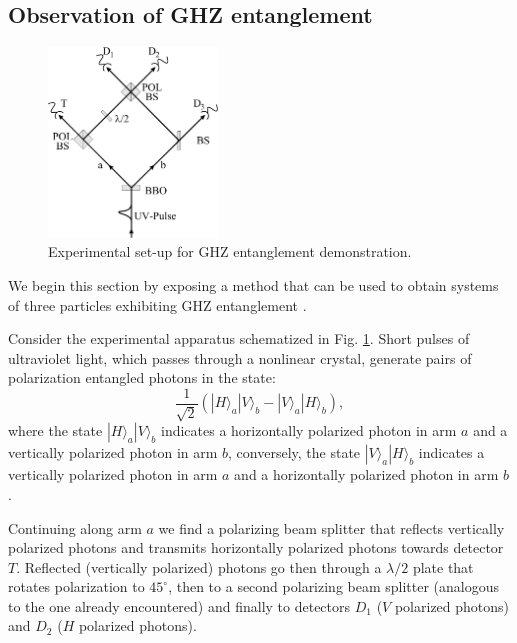 \subsection{Observation of GHZ entanglement}

\begin{figure}
  \centering
  \includegraphics[width=0.4\textwidth]{Mainmatter/Chapter3/ghz-entanglement.png}
  \caption{Experimental set-up for GHZ entanglement demonstration.}
  \label{fig:ghz-entanglement}
\end{figure}

We begin this section by exposing a method that can be used to obtain systems of three particles exhibiting GHZ entanglement \cite{PhysRevLett.82.1345}.

Consider the experimental apparatus schematized in Fig. \ref{fig:ghz-entanglement}. Short pulses of ultraviolet light, which passes through a nonlinear crystal, generate pairs of polarization entangled photons in the state:
\begin{equation}
  \frac{1}{\sqrt{2}} \left( |H\rangle_a |V\rangle_b - |V\rangle_a |H\rangle_b \right),
\end{equation}
where the state $|H\rangle_a |V\rangle_b$ indicates a horizontally polarized photon in arm $a$ and a vertically polarized photon in arm $b$, conversely, the state $|V\rangle_a |H\rangle_b$ indicates a vertically polarized photon in arm $a$ and a horizontally polarized photon in arm $b$.

Continuing along arm $a$ we find a polarizing beam splitter that reflects vertically polarized photons and transmits horizontally polarized photons towards detector $T$. Reflected (vertically polarized) photons go then through a $\lambda/2$ plate that rotates polarization to $45^\circ$, then to a second polarizing beam splitter (analogous to the one already encountered) and finally to detectors $D_1$ ($V$ polarized photons) and $D_2$ ($H$ polarized photons).

